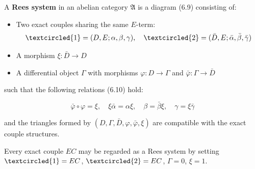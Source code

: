 A \textbf{Rees system} in an abelian category $\mathfrak{A}$ is a diagram (6.9) consisting of:

\begin{itemize}
\item Two exact couples sharing the same $E$-term:
  $$\textcircled{1} = (D, E; \alpha, \beta, \gamma), \quad \textcircled{2} = (\bar{D}, E; \bar{\alpha}, \bar{\beta}, \bar{\gamma})$$
\item A morphism $\xi : \bar{D} \to D$
\item A differential object $\Gamma$ with morphisms $\varphi : D \to \Gamma$ and $\bar{\varphi} : \Gamma \to \bar{D}$
\end{itemize}

such that the following relations (6.10) hold:

$$\bar{\varphi} \circ \varphi = \xi, \quad \xi \bar{\alpha} = \alpha \xi, \quad \beta = \bar{\beta} \xi, \quad \gamma = \xi \bar{\gamma}$$

and the triangles formed by $(D, \Gamma, \bar{D}, \varphi, \bar{\varphi}, \xi)$ are compatible with the exact couple structures.

Every exact couple $EC$ may be regarded as a Rees system by setting $\textcircled{1} = EC$, $\textcircled{2} = EC$, $\Gamma = 0$, $\xi = 1$.
